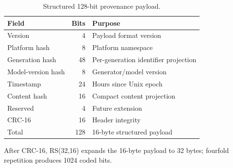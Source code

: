\begin{table}[t]
\centering
\caption{Structured 128-bit provenance payload.}
\label{tab:payload}
\begin{tabular}{l r l}
\toprule
Field & Bits & Purpose \\
\midrule
Version & 4 & Payload format version \\
Platform hash & 8 & Platform namespace \\
Generation hash & 48 & Per-generation identifier projection \\
Model-version hash & 8 & Generator/model version \\
Timestamp & 24 & Hours since Unix epoch \\
Content hash & 16 & Compact content projection \\
Reserved & 4 & Future extension \\
CRC-16 & 16 & Header integrity \\
Total & 128 & 16-byte structured payload \\
\bottomrule
\end{tabular}
\par\smallskip
\footnotesize After CRC-16, RS(32,16) expands the 16-byte payload to 32 bytes; fourfold repetition produces 1024 coded bits.
\end{table}
